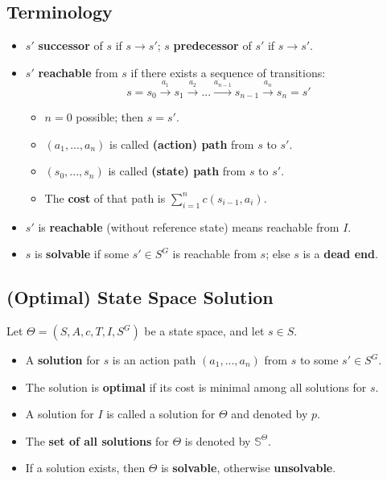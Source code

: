 \documentclass[conference]{styles/acmsiggraph}
\begin{document}
    \subsection{Terminology}
        \begin{itemize}
            \item $s'$ \textbf{successor} of $s$ if $s \rightarrow s'$; $s$ \textbf{predecessor} of $s'$ if $s \rightarrow s'$.
            \item $s'$ \textbf{reachable} from $s$ if there exists a sequence of transitions:
                $$s = s_0 \xrightarrow{a_1} s_1 \xrightarrow{a_2} ... \xrightarrow{a_{n-1}} s_{n-1} \xrightarrow{a_n} s_n = s'$$
                \begin{itemize}
                    \item $n=0$ possible; then $s=s'$.
                    \item $(a_1,...,a_n)$ is called \textbf{(action) path} from $s$ to $s'$.
                    \item $(s_0,...,s_n)$ is called \textbf{(state) path} from $s$ to $s'$.
                    \item The \textbf{cost} of that path is $\sum\limits_{i=1}^n c(s_{i-1},a_i)$.
                \end{itemize}
            \item $s'$ is \textbf{reachable} (without reference state) means reachable from $I$.
            \item $s$ is \textbf{solvable} if some $s' \in S^G$ is reachable from $s$; else $s$ is a \textbf{dead end}.
        \end{itemize}
    
    
    \subsection{(Optimal) State Space Solution}
        Let $\Theta = (S,A,c,T,I,S^G)$ be a state space, and let $s\in S$.
        \begin{itemize}
            \item A \textbf{solution} for $s$ is an action path $(a_1,...,a_n)$ from $s$ to some $s' \in S^G$.
            \item The solution is \textbf{optimal} if its cost is minimal among all solutions for $s$.
            \item A solution for $I$ is called a solution for $\Theta$ and denoted by $p$.
            \item The \textbf{set of all solutions} for $\Theta$ is denoted by $\mathbb{S}^{\Theta}$.
            \item If a solution exists, then $\Theta$ is \textbf{solvable}, otherwise \textbf{unsolvable}.
        \end{itemize}
        
\end{document}
